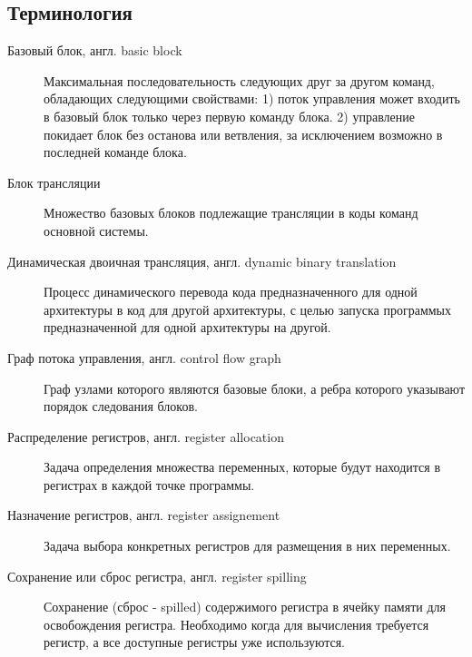 \subsection{Терминология}
\begin{description}

\item[Базовый блок, англ. basic block]

Максимальная последовательность следующих друг за другом команд, обладающих следующими свойствами: 1) поток управления может входить в базовый блок только через первую команду блока. 2) управление покидает блок без останова или ветвления, за исключением возможно в последней команде блока.

\item[Блок трансляции]

Множество базовых блоков подлежащие трансляции в коды команд основной системы.

\item[Динамическая двоичная трансляция, англ. dynamic binary translation]

Процесс динамического перевода кода предназначенного для одной архитектуры в код для другой архитектуры, с целью запуска программых предназначенной для одной архитектуры на другой.

\item[Граф потока управления, англ. control flow graph]

Граф узлами которого являются базовые блоки, а ребра которого указывают порядок следования блоков.

\item[Распределение регистров, англ. register allocation]

Задача определения множества переменных, которые будут находится в регистрах в каждой точке программы.

\item[Назначение регистров, англ. register assignement]

Задача выбора конкретных регистров для размещения в них переменных.

\item[Сохранение или сброс регистра, англ. register spilling]

Сохранение (сброс - spilled) содержимого регистра в ячейку памяти для освобождения регистра. Необходимо
когда для вычисления требуется регистр, а все доступные регистры уже используются.



\end{description}

